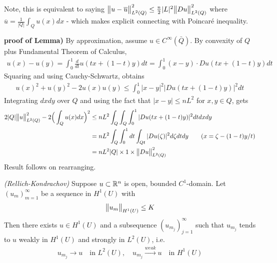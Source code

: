 \documentclass[10pt,a4paper]{report}
\newenvironment{proof}
{\begin{changemargin}{1cm}{0.5cm} 
	}%
	{\end{changemargin}
}
\begin{document}
Note, this is equivalent to saying $\bigl\lVert u - \overline{u}\bigr\rVert_{L^2(Q)}^2 \leq \frac{n}{2} |L|^2 \bigl\lVert Du\bigr\rVert_{L^2(Q)}^2$ where $\overline{u} = \frac{1}{|Q|} \int_Q u(x) dx$ - which makes explicit connecting with Poincar\'{e} inequality.
\s

\begin{proof}
\textbf{proof of Lemma)} By approximation, assume $u\in C^{\infty}(\bar{Q})$. By convexity of $Q$ plus Fundamental Theorem of Calculus,
\begin{align*}
u(x) -u(y) = \int_0^1 \frac{d}{dt} u(tx + (1-t)y) dt = \int_0^1 (x-y) \cdot Du(tx + (1-t)y) dt
\end{align*}
Squaring and using Cauchy-Schwartz, obtains
\begin{align*}
u(x)^2 + u(y)^2 - 2u(x) u(y) \leq \int_0^1 |x-y|^2 |Du(tx + (1-t)y)|^2 dt
\end{align*}
Integrating $dx dy$ over $Q$ and using the fact that $|x-y| \leq nL^2$ for $x,y\in Q$, gets
\begin{align*}
2|Q| \bigl\lVert u\bigr\rVert_{L^2(Q)}^2 -2 \Big( \int_Q u(x) dx\Big)^2 &\leq nL^2 \int_Q \int_Q \int_0^1 |Du(tx + (1-t)y)|^2 dtdxdy \\
&= nL^2 \int_Q  \int_0^1 dt \int_{Qt} |Du(\zeta)|^2 d\zeta dtdy \quad \quad  (x = \zeta - (1-t)y/t) \\
&= nL^2 |Q| \times 1 \times \bigl\lVert Du\bigr\rVert_{L^2(Q)}^2
\end{align*}
Result follows on rearranging.

\eop
\end{proof}
\s

\thm \emph{(Rellich-Kondrachov)} Suppose $u \subset \mathbb{R}^n$ is open, bounded $C^1$-domain. Let $(u_m)_{m=1}^{\infty}$ be a sequence in $H^1(U)$ with
\begin{align*}
\bigl\lVert u_m\bigr\rVert_{H^1(U)} \leq K
\end{align*}
Then there exists $u\in H^1(U)$ and a subsequence $(u_{m_j})_{j=1}^{\infty}$ such that $u_{m_j}$ tends to $u$ weakly in $H^1(U)$ and strongly in $L^2(U)$, i.e.
\begin{align*}
u_{m_j} \rightarrow u \quad \text{in } L^2(U), \quad u_{m_j} \xrightarrow{weak} u \quad \text{in } H^1(U)
\end{align*}
\end{document}
